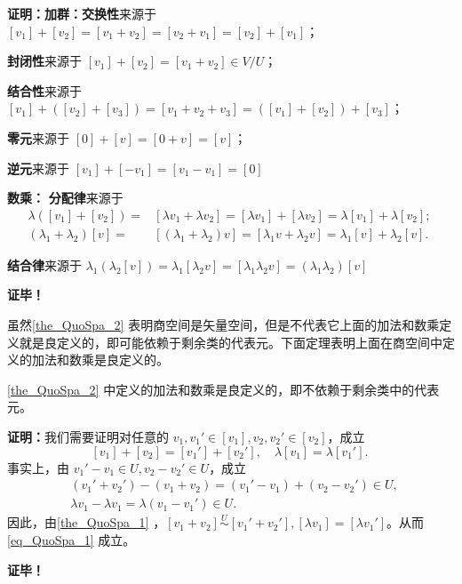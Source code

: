 \textbf{证明：}\textbf{加群：}\textbf{交换性}来源于 $[v_1] + [v_2]= [v_1 + v_2]=[v_2+v_1]=[v_2] + [v_1]$；

\textbf{封闭性}来源于 $[v_1]+[v_2]=[v_1+v_2]\in V/U$；

\textbf{结合性}来源于 $[v_1] + ([v_2]+[v_3])= [v_1 + v_2+v_3]=([v_1]+[v_2])+[v_3]$；

\textbf{零元}来源于 $[0]+[v]=[0+v]=[v]$；

\textbf{逆元}来源于 $[v_1]+[-v_1]=[v_1-v_1]=[0]$

\textbf{数乘：}
\textbf{分配律}来源于 
\begin{equation}
\begin{aligned}
\lambda([v_1]+[v_2])=&[\lambda v_1+\lambda v_2]=[\lambda v_1]+[\lambda v_2]=\lambda[v_1]+\lambda[v_2];\\
(\lambda_1+\lambda_2)[v]=&[(\lambda_1+\lambda_2)v]=[\lambda_1v+\lambda_2 v]=\lambda_1[v]+\lambda_2[v].
\end{aligned}~
\end{equation}

\textbf{结合律}来源于 $\lambda_1(\lambda_2[v])=\lambda_1[\lambda_2 v]=[\lambda_1\lambda_2 v]=(\lambda_1\lambda_2)[v]$

\textbf{证毕！}

虽然\autoref{the_QuoSpa_2} 表明商空间是矢量空间，但是不代表它上面的加法和数乘定义就是良定义的，即可能依赖于剩余类的代表元。下面定理表明上面在商空间中定义的加法和数乘是良定义的。

\begin{theorem}{}
\autoref{the_QuoSpa_2} 中定义的加法和数乘是良定义的，即不依赖于剩余类中的代表元。
\end{theorem}
\textbf{证明：}我们需要证明对任意的 $v_1,v_1'\in[v_1],v_2,v_2'\in [v_2]$，成立
\begin{equation}\label{eq_QuoSpa_1}
[v_1]+[v_2]=[v_1']+[v_2'],\quad \lambda [v_1]=\lambda [v_1'].~
\end{equation}
事实上，由 $v_1'-v_1\in U,v_2-v_2'\in U$，成立
\begin{equation}
\begin{aligned}
&(v_1'+v_2')-(v_1+v_2)=(v_1'-v_1)+(v_2-v_2')\in U,\\
&\lambda v_1-\lambda v_1=\lambda (v_1-v_1')\in U.
\end{aligned}~
\end{equation}
因此，由\autoref{the_QuoSpa_1} ，$[v_1+v_2]\overset{U}{\sim}[v_1'+v_2'],[\lambda v_1]=[\lambda v_1']$。从而\autoref{eq_QuoSpa_1} 成立。

\textbf{证毕！}




